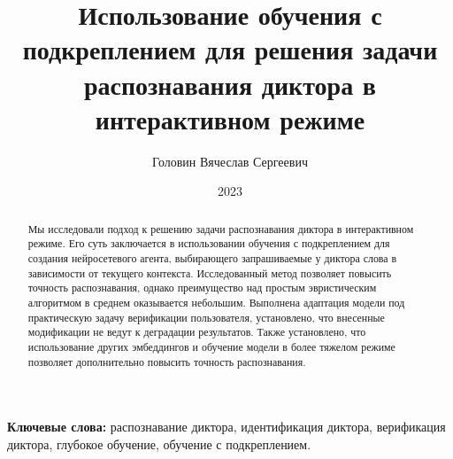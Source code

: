 \documentclass[14pt]{spbau-diploma}
\author{Головин Вячеслав Сергеевич}
\title{Использование обучения с подкреплением для решения задачи распознавания
диктора в интерактивном режиме}
\date{2023}
\begin{document}


\begin{abstract}
    Мы исследовали подход к решению задачи распознавания диктора в интерактивном
    режиме. Его суть заключается в использовании обучения с подкреплением для
    создания нейросетевого агента, выбирающего запрашиваемые у диктора слова
    в зависимости от текущего контекста. Исследованный метод позволяет повысить
    точность распознавания, однако преимущество над простым эвристическим
    алгоритмом в среднем оказывается небольшим. Выполнена адаптация модели под
    практическую задачу верификации пользователя, установлено, что внесенные
    модификации не ведут к деградации результатов. Также установлено, что
    использование других эмбеддингов и обучение модели в более тяжелом режиме
    позволяет дополнительно повысить точность распознавания.
\end{abstract}

\textbf{Ключевые слова:} распознавание диктора, идентификация диктора,
верификация диктора, глубокое обучение, обучение с подкреплением.
\end{document}
